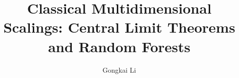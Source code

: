 \documentclass[12pt,oneside,final]{thesis}
\begin{document}
\title{Classical Multidimensional Scalings: Central Limit Theorems and Random Forests}
\author{Gongkai Li}
\dissertation
\doctorphilosophy
\copyrightnotice





%
%
%

%


%
%

\def\newblock{\hskip .11em plus.33em minus.07em}




\end{document}
